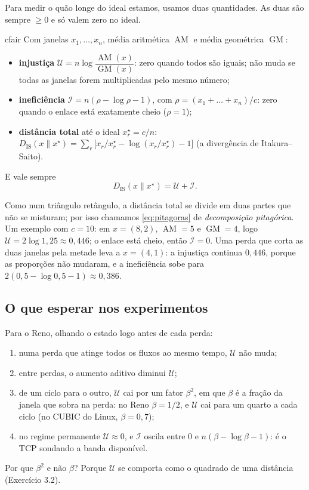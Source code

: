 \documentclass[11pt,a4paper]{article}
\newcommand{\AM}{\operatorname{AM}}
\newcommand{\GM}{\operatorname{GM}}
\newcommand{\Dis}{D_{\mathrm{IS}}}
\begin{document}
Para medir o quão longe do ideal estamos, usamos duas quantidades. As duas são sempre
$\ge0$ e só valem zero no ideal.

\begin{caixa}[title=Para calcular (fluxos com o mesmo RTT)]{cfair}
Com janelas $x_1,\dots,x_n$, média aritmética $\AM$ e média geométrica $\GM$:
\begin{itemize}
\item \textbf{injustiça} $\mathcal U=n\log\dfrac{\AM(x)}{\GM(x)}$: zero quando todos são
iguais; não muda se todas as janelas forem multiplicadas pelo mesmo número;
\item \textbf{ineficiência} $\mathcal I=n(\rho-\log\rho-1)$, com
$\rho=(x_1+\dots+x_n)/c$: zero quando o enlace está exatamente cheio ($\rho=1$);
\item \textbf{distância total} até o ideal $x^\star_r=c/n$:
$\Dis(x\|x^\star)=\sum_r\big[x_r/x^\star_r-\log(x_r/x^\star_r)-1\big]$ (a divergência
de Itakura--Saito).
\end{itemize}
E vale sempre
\begin{equation}
\Dis(x\|x^\star)=\mathcal U+\mathcal I .
\label{eq:pitagoras}
\end{equation}
\end{caixa}

Como num triângulo retângulo, a distância total se divide em duas partes que não se
misturam; por isso chamamos \eqref{eq:pitagoras} de \emph{decomposição pitagórica}.
Um exemplo com $c=10$: em $x=(8,2)$, $\AM=5$ e $\GM=4$, logo
$\mathcal U=2\log1{,}25\approx0{,}446$; o enlace está cheio, então $\mathcal I=0$. Uma
perda que corta as duas janelas pela metade leva a $x=(4,1)$: a injustiça continua
$0{,}446$, porque as proporções não mudaram, e a ineficiência sobe para
$2(0{,}5-\log0{,}5-1)\approx0{,}386$.

\subsection{O que esperar nos experimentos}

Para o Reno, olhando o estado logo antes de cada perda:
\begin{enumerate}[label=(\roman*)]
\item numa perda que atinge todos os fluxos ao mesmo tempo, $\mathcal U$ não muda;
\item entre perdas, o aumento aditivo diminui $\mathcal U$;
\item de um ciclo para o outro, $\mathcal U$ cai por um fator $\beta^2$, em que $\beta$ é
a fração da janela que sobra na perda: no Reno $\beta=1/2$, e $\mathcal U$ cai para um
quarto a cada ciclo (no CUBIC do Linux, $\beta=0{,}7$);
\item no regime permanente $\mathcal U\approx0$, e $\mathcal I$ oscila entre $0$ e
$n(\beta-\log\beta-1)$: é o TCP sondando a banda disponível.
\end{enumerate}
Por que $\beta^2$ e não $\beta$? Porque $\mathcal U$ se comporta como o quadrado de uma
distância (Exercício 3.2).
\end{document}
